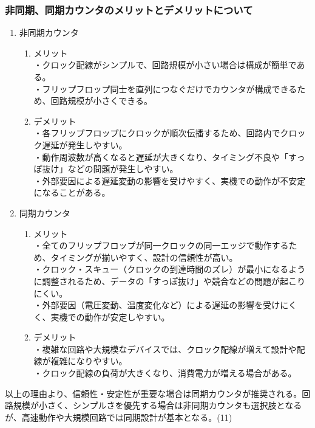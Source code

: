 \documentclass{jlreq}
\numberwithin{equation}{section}
\begin{document}
\subsubsection{非同期、同期カウンタのメリットとデメリットについて}
\begin{enumerate}
  \item 非同期カウンタ
  \begin{enumerate}
    \item メリット \\
    ・クロック配線がシンプルで、回路規模が小さい場合は構成が簡単である。\\
    ・フリップフロップ同士を直列につなぐだけでカウンタが構成できるため、回路規模が小さくできる。\\
    \item デメリット \\
    ・各フリップフロップにクロックが順次伝播するため、回路内でクロック遅延が発生しやすい。\\
    ・動作周波数が高くなると遅延が大きくなり、タイミング不良や「すっぽ抜け」などの問題が発生しやすい。\\
    ・外部要因による遅延変動の影響を受けやすく、実機での動作が不安定になることがある。\\
  \end{enumerate}
   \item 同期カウンタ
  \begin{enumerate}
    \item メリット \\
    ・全てのフリップフロップが同一クロックの同一エッジで動作するため、タイミングが揃いやすく、設計の信頼性が高い。\\
    ・クロック・スキュー（クロックの到達時間のズレ）が最小になるように調整されるため、データの「すっぽ抜け」や競合などの問題が起こりにくい。\\
    ・外部要因（電圧変動、温度変化など）による遅延の影響を受けにくく、実機での動作が安定しやすい。
    \item デメリット \\
    ・複雑な回路や大規模なデバイスでは、クロック配線が増えて設計や配線が複雑になりやすい。\\
    ・クロック配線の負荷が大きくなり、消費電力が増える場合がある。
  \end{enumerate}
\end{enumerate}

以上の理由より、信頼性・安定性が重要な場合は同期カウンタが推奨される。回路規模が小さく、シンプルさを優先する場合は非同期カウンタも選択肢となるが、高速動作や大規模回路では同期設計が基本となる。(11)
\end{document}
